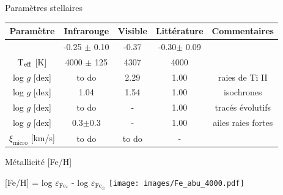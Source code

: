 \documentclass[10pt]{beamer}
\begin{document}
\begin{frame}[fragile]{Paramètres stellaires}
    \begin{table}[h!]
        \begin{center}
            \renewcommand{\arraystretch}{1.5}
            \begin{tabular}{c|ccc|c}
                Paramètre & Infrarouge &Visible& Littérature &Commentaires\\
                \hline
                \arrayrulecolor{red}\hline
                \multicolumn{1}{|c}{$[$Fe/H$]$ [dex]}& -0.25 $\pm$ 0.10 & -0.37 &
                -0.30$\pm$ 0.09&\multicolumn{1}{c|}{}\\
                \arrayrulecolor{red}\hline
                T$_{\rm eff}$ [K] & 4000 $\pm$ 125 &4307 & 4000& \\
    
                log $g$ [dex]& to do & 2.29 & 1.00&raies de Ti II\\
                log $g$ [dex] & 1.04 & 1.54 & 1.00 &isochrones\\
                log $g$ [dex] & to do & - & 1.00 &tracés évolutifs\\
                log $g$ [dex] & 0.3$\pm$0.3 &-& 1.00 &ailes raies fortes\\
                $\xi_{\text{micro}}$ [km/s]& to do & to do & - &\\
            \end{tabular}
        \end{center}
    \end{table}
    \end{frame}

\begin{frame}[fragile]{Métallicité [Fe/H]}
    \begin{center}
        [Fe/H] = log $\varepsilon_{\mathrm{Fe_*}}$ - log $\varepsilon_{\mathrm{Fe_{\odot}}}$
        \texttt{[image: images/Fe\_abu\_4000.pdf]}
    \end{center}
\end{frame}
\end{document}
